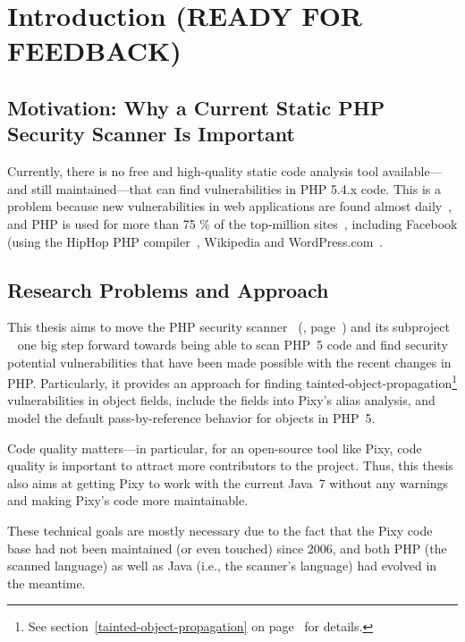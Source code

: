 \chapter{Introduction (READY FOR FEEDBACK)}

\section{Motivation: Why a Current Static PHP Security Scanner Is Important}
Currently, there is no free and high-quality static code analysis tool available---and still maintained---that can find vulnerabilities in PHP 5.4.x code. This is a problem because new vulnerabilities in web applications are found almost daily~\cite{osvdb}, and PHP is used for more than 75 \% of the top-million sites~\cite{w3techs-php-usage}, including Facebook (using the HipHop PHP compiler~\cite{hiphop}, Wikipedia and WordPress.com~\cite{w3techs-php-sites}.


\section{Research Problems and Approach}

This thesis aims to move the PHP security scanner ~(\cite{pixy}, page~\pageref{pixy}) and its subproject ~\cite{phpparser} one big step forward towards being able to scan PHP~5 code and find security potential vulnerabilities that have been made possible with the recent changes in PHP. Particularly, it provides an approach for finding tainted-object-propagation\footnote{See section~\ref{tainted-object-propagation} on page~\pageref{tainted-object-propagation} for details.} vulnerabilities in object fields, include the fields into Pixy's alias analysis, and model the default pass-by-reference behavior for objects in PHP~5.

Code quality matters---in particular, for an open-source tool like Pixy, code quality is important to attract more contributors to the project. Thus, this thesis also aims at getting Pixy to work with the current Java~7 without any warnings and making Pixy's code more maintainable.

These technical goals are mostly necessary due to the fact that the Pixy code base had not been maintained (or even touched) since 2006, and both PHP (\ie the scanned language) as well as Java (i.e., the scanner's language) had evolved in the meantime.
